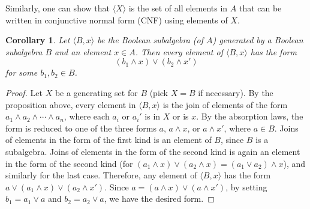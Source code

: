 \documentclass[12pt]{article}
\newtheorem{cor}{Corollary}
\begin{document}
Similarly, one can show that $\langle X\rangle$ is the set of all elements in $A$ that can be written in conjunctive normal form (CNF) using elements of $X$.

\begin{cor} Let $\langle B,x\rangle$ be the Boolean subalgebra (of $A$) generated by a Boolean subalgebra $B$ and an element $x\in A$.  Then every element of $\langle B,x\rangle$ has the form $$(b_1\wedge x)\vee (b_2\wedge x')$$ for some $b_1,b_2\in B$. \end{cor}
\begin{proof}
Let $X$ be a generating set for $B$ (pick $X=B$ if necessary).  By the proposition above, every element in $\langle B,x\rangle$ is the join of elements of the form $a_1\wedge a_2\wedge \cdots \wedge a_n$, where each $a_i$ or $a_i'$ is in $X$ or is $x$.  By the absorption laws, the form is reduced to one of the three forms $a$, $a\wedge x$, or $a\wedge x'$, where $a\in B$.  Joins of elements in the form of the first kind is an element of $B$, since $B$ is a subalgebra.  Joins of elements in the form of the second kind is again an element in the form of the second kind (for $(a_1\wedge x)\vee (a_2\wedge x)=(a_1\vee a_2)\wedge x$), and similarly for the last case.  Therefore, any element of $\langle B,x\rangle$ has the form $a\vee (a_1\wedge x)\vee (a_2\wedge x')$.  Since $a=(a\wedge x)\vee (a\wedge x')$, by setting $b_1=a_1\vee a$ and $b_2=a_2\vee a$, we have the desired form.
\end{proof}
\end{document}
